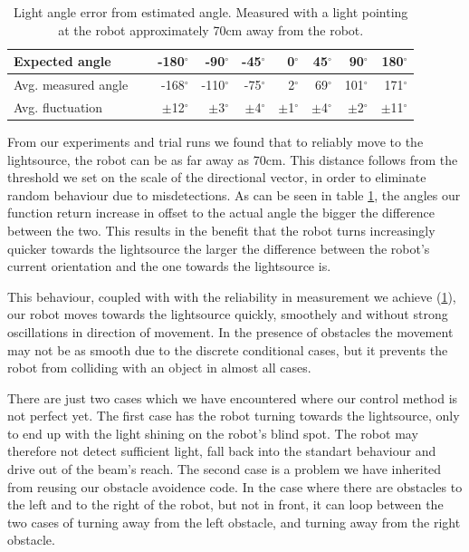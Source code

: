 \documentclass[paper=a4, fontsize=12pt]{scrartcl}	%
\numberwithin{equation}{section}		%
\numberwithin{figure}{section}			%
\numberwithin{table}{section}				%
\begin{document}
\begin{table}
  \begin{tabular}{l | r r r r r r r |}
      Expected angle   		 & -180\(^{\circ}\)  & -90\(^{\circ}\)  & -45\(^{\circ}\)  & 0\(^{\circ}\)    & 45\(^{\circ}\)   & 90\(^{\circ}\)   & 180\(^{\circ}\) \\ \hline
      Avg. measured angle	 & -168\(^{\circ}\)  & -110\(^{\circ}\) & -75\(^{\circ}\)  & 2\(^{\circ}\)    & 69\(^{\circ}\)   & 101\(^{\circ}\)  & 171\(^{\circ}\) \\ \hline
      Avg. fluctuation		 & \(\pm\)12\(^{\circ}\) & \(\pm\)3\(^{\circ}\) & \(\pm\)4\(^{\circ}\) & \(\pm\)1\(^{\circ}\) & \(\pm\)4\(^{\circ}\) & \(\pm\)2\(^{\circ}\) & \(\pm\)11\(^{\circ}\) \\	
  \end{tabular}
  \caption{Light angle error from estimated angle. Measured with a light pointing at the robot approximately 70cm away from the robot.}
  \label{tab:angleError}
\end{table}

From our experiments and trial runs we found that to reliably move to the lightsource, the robot can be as far away as 70cm. This distance follows from the threshold we set on the scale of the directional vector, in order to eliminate random behaviour due to misdetections. As can be seen in table \ref{tab:angleError}, the angles our function return increase in offset to the actual angle the bigger the difference between the two. This results in the benefit that the robot turns increasingly quicker towards the lightsource the larger the difference between the robot's current orientation and the one towards the lightsource is.

This behaviour, coupled with with the reliability in measurement we achieve (\ref{tab:angleError}), our robot moves towards the lightsource quickly, smoothely and without strong oscillations in direction of movement. In the presence of obstacles the movement may not be as smooth due to the discrete conditional cases, but it prevents the robot from colliding with an object in almost all cases.

There are just two cases which we have encountered where our control method is not perfect yet. The first case has the robot turning towards the lightsource, only to end up with the light shining on the robot's blind spot. The robot may therefore not detect sufficient light, fall back into the standart behaviour and drive out of the beam's reach. The second case is a problem we have inherited from reusing our obstacle avoidence code. In the case where there are obstacles to the left and to the right of the robot, but not in front, it can loop between the two cases of turning away from the left obstacle, and turning away from the right obstacle.
\end{document}
